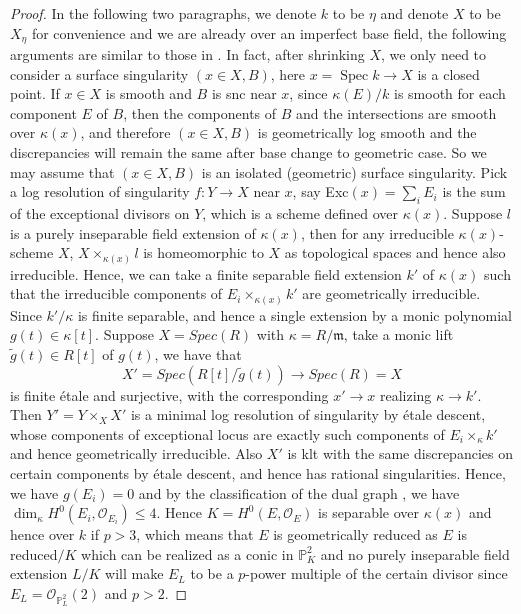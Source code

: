 \documentclass[letterpaper,reqno,12pt]{amsart}
\DeclareMathOperator{\Spec}{Spec}
\numberwithin{equation}{section}
\theoremstyle{plain}
\begin{document}
\begin{proof}
    In the following two paragraphs, we denote $k$ to be $\eta$ and denote $X$ to be $X_\eta$ for convenience and we are already over an imperfect base field, the following arguments are similar to those in \cite{sato2024generalhyperplanesectionslog}. In fact, after shrinking $X$, we only need to consider a surface singularity $(x\in X,B)$, here $x=\Spec k\to X$ is a closed point. If $x\in X$ is smooth and $B$ is snc near $x$, since $\kappa(E)/k$ is smooth for each component $E$ of $B$, then the components of $B$ and the intersections are smooth over $\kappa(x)$, and therefore $(x\in X,B)$ is geometrically log smooth and the discrepancies will remain the same after base change to geometric case. So we may assume that $(x\in X,B)$ is an isolated (geometric) surface singularity. Pick a log resolution of singularity $f:Y\to X$ near $x$, say Exc$(x)=\sum\limits_iE_i$ is the sum of the exceptional divisors on $Y$, which is a scheme defined over $\kappa(x)$. Suppose $l$ is a purely inseparable field extension of $\kappa(x)$, then for any irreducible $\kappa(x)$-scheme $X$, $X\times_{\kappa(x)}l$ is homeomorphic to $X$ as topological spaces and hence also irreducible. Hence, we can take a finite separable field extension $k'$ of $\kappa(x)$ such that the irreducible components of $E_i\times_{\kappa(x)}k'$ are geometrically irreducible. Since $k'/\kappa$ is finite separable, and hence a single extension by a monic polynomial $g(t)\in \kappa[t]$. Suppose $X=Spec(R)$ with $\kappa=R/\mathfrak m$, take a monic lift $\tilde g(t)\in R[t]$ of $g(t)$, we have that \[X'=Spec(R[t]/\tilde g(t))\to Spec(R)=X\] is finite étale and surjective, with the corresponding $x'\to x$ realizing $\kappa\to k'$.  Then $Y'=Y\times_XX'$ is a minimal log resolution of singularity by étale descent, whose components of exceptional locus are exactly such components of $E_i\times_\kappa k'$ and hence geometrically irreducible. Also $X'$ is klt with the same discrepancies on certain components by étale descent, and hence has rational singularities. Hence, we have $g(E_i)=0$ and by the classification of the dual graph \cite[A.3]{sato2024generalhyperplanesectionslog}, we have $\dim_{\kappa}H^0(E_i,\mathcal O_{E_i})\leq 4$. Hence $K=H^0(E,\mathcal O_E)$ is separable over $\kappa(x)$ and hence over $k$ if $p>3$, which means that $E$ is geometrically reduced as $E$ is reduced$/K$ which can be realized as a conic in $\mathbb P_{K}^2$ and no purely inseparable field extension $L/K$ will make $E_L$ to be a $p$-power multiple of the certain divisor since $E_L=\mathcal O_{\mathbb P_L^2}(2)$ and $p>2$.


\end{proof}
\end{document}
